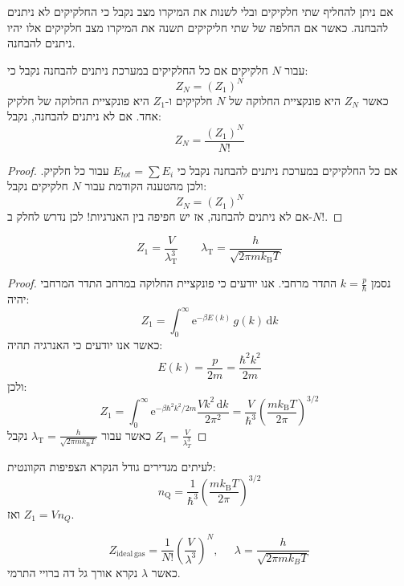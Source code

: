 \documentclass{tstextbook}
\begin{document}
\begin{definition}
אם ניתן להחליף שתי חלקיקים ובלי לשנות את המיקרו מצב נקבל כי החלקיקים לא ניתנים להבחנה. כאשר אם החלפה של שתי חליקיקים תשנה את המיקרו מצב חלקיקים אלו יהיו ניתנים להבחנה.

\end{definition}
\begin{proposition}
עבור \(N\) חלקיקים אם כל החלקיקים במערכת ניתנים להבחנה נקבל כי:
$$Z_{N}=(Z_{1})^{N}$$
כאשר \(Z_{N}\) היא פונקציית החלוקה של \(N\) חלקיקים ו-\(Z_{1}\) היא פונקציית החלוקה של חלקיק אחד.
אם לא ניתנים להבחנה, נקבל:
$$Z_{N}=\frac{(Z_{1})^{N}}{N!}$$

\end{proposition}
\begin{proof}
אם כל החלקיקים במערכת ניתנים להבחנה נקבל כי \(E_{tot}=\sum E_{i}\) עבור כל חלקיק. ולכן מהטענה הקודמת עבור \(N\) חלקיקים נקבל:
$$Z_{N}=(Z_{1})^{N}$$
אם לא ניתנים להבחנה, אז יש חפיפה בין האנרגיות! לכן נדרש לחלק ב-\(N!\).

\end{proof}
\begin{proposition}
$$Z_{1}=\frac{V}{\lambda_{\mathrm{T}}^{3}} \qquad \lambda_{\mathrm{T}}=\frac{h}{\sqrt{2\pi m k_{\mathrm{B}}T}}$$

\end{proposition}
\begin{proof}
נסמן \(k=\frac{p}{\hbar}\) התדר מרחבי. אנו יודעים כי פונקציית החלוקה במרחב התדר המרחבי יהיה:
$$Z_{1}=\int_{0}^{\infty}\mathrm{e}^{-\beta E(k)}\,g(k)\,\mathrm{d}k$$
כאשר אנו יודעים כי האנרגיה תהיה:
$$E(k)=\frac{p}{2m}=\frac{\hbar^{2}k^{2}}{2m}$$
ולכן:
$$Z_{1}=\int_{0}^{\infty}\mathrm{e}^{-\beta\hbar^{2}k^{2}/2m}{\frac{V k^{2}\,\mathrm{d}k}{2\pi^{2}}}={\frac{V}{\hbar^{3}}}\left({\frac{m k_{\mathrm{B}}T}{2\pi}}\right)^{3/2}$$
כאשר עבור \(\lambda_{\mathrm{T}}=\frac{h}{\sqrt{2\pi m k_{\mathrm{B}}T}}\) נקבל \(Z_{1}=\frac{V}{\lambda_{T}^{3}}\)

\end{proof}
\begin{remark}
לעיתים מגדירים גודל הנקרא הצפיפות הקוונטית:
$$n_{\mathrm{Q}}=\frac{1}{\hbar^{3}}\left(\frac{m k_{\mathrm{B}}T}{2\pi}\right)^{3/2}$$
ואז \(Z_{1}=Vn_{Q}\).

\end{remark}
\begin{proposition}
$$Z_{\mathrm{ideal\,gas}}=\frac{1}{N!}\left(\frac{V}{\lambda^{3}}\right)^{N},\;\;\;\;\;\lambda=\frac{h}{\sqrt{2\pi m k_{B}T}}$$
כאשר \(\lambda\) נקרא אורך גל דה ברויי התרמי.

\end{proposition}
\end{document}
